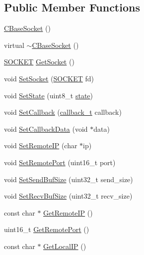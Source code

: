 \subsection*{Public Member Functions}
\begin{DoxyCompactItemize}
\item 
\hyperlink{class_c_base_socket_addf3bf444356a73e1b22b267ffcc3cae}{C\+Base\+Socket} ()
\item 
virtual \hyperlink{class_c_base_socket_affd9b0d8c2917fdc30ff421217ef3c0f}{$\sim$\+C\+Base\+Socket} ()
\item 
\hyperlink{base_2ostype_8h_a8dc8083897335125630f1af5dafd5831}{S\+O\+C\+K\+E\+T} \hyperlink{class_c_base_socket_a67f302722909a6de5740dfa0b99d80f6}{Get\+Socket} ()
\item 
void \hyperlink{class_c_base_socket_ac3d800a30aea0b1c73ebd5d6b9ed8a50}{Set\+Socket} (\hyperlink{base_2ostype_8h_a8dc8083897335125630f1af5dafd5831}{S\+O\+C\+K\+E\+T} fd)
\item 
void \hyperlink{class_c_base_socket_a911c9a90e052e1a1969e046bec4dae8a}{Set\+State} (uint8\+\_\+t \hyperlink{_http_parser_8cpp_adc6e5733fc3c22f0a7b2914188c49c90}{state})
\item 
void \hyperlink{class_c_base_socket_afd663f9a74d47ddf732115c8cbfde08b}{Set\+Callback} (\hyperlink{msfs_2include_2common_2ostype_8h_a126e68a4e9bb7ecb6c88b2eeb66a0ee7}{callback\+\_\+t} callback)
\item 
void \hyperlink{class_c_base_socket_a7b157b0848d2d2c317d36c1bd947db2e}{Set\+Callback\+Data} (void $\ast$data)
\item 
void \hyperlink{class_c_base_socket_a50368e1e128ed2659bdfea7d5db49364}{Set\+Remote\+I\+P} (char $\ast$ip)
\item 
void \hyperlink{class_c_base_socket_aed856b547dcbd071746dfcafe6bd07df}{Set\+Remote\+Port} (uint16\+\_\+t port)
\item 
void \hyperlink{class_c_base_socket_a7c242800e3dc9e638f28688c73ff7d4f}{Set\+Send\+Buf\+Size} (uint32\+\_\+t send\+\_\+size)
\item 
void \hyperlink{class_c_base_socket_ac13ac6f0958c835e8177f800b71dc59f}{Set\+Recv\+Buf\+Size} (uint32\+\_\+t recv\+\_\+size)
\item 
const char $\ast$ \hyperlink{class_c_base_socket_ab67e2d8ea84d36dfddc3975460727adc}{Get\+Remote\+I\+P} ()
\item 
uint16\+\_\+t \hyperlink{class_c_base_socket_a12c343b70b478d8f7e094dd91d4dafb2}{Get\+Remote\+Port} ()
\item 
const char $\ast$ \hyperlink{class_c_base_socket_adc18d9100f4e1981a092c964444f62bd}{Get\+Local\+I\+P} ()

\end{DoxyCompactItemize}

